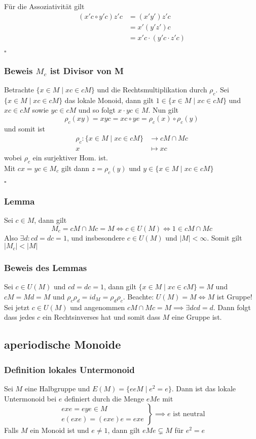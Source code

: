 \documentclass[12pt, german]{article}
\newcommand{\bewiesen}{
	
	\begin{flushright}
		$\square$  \\
\end{flushright}}
\begin{document}
	Für die Assoziativität gilt 
		\begin{align*}
			(x'c \circ y'c)z'c &= (x'y')z'c \\
				&= x'(y'z')c \\
				&= x'c \cdot (y'c \cdot z'c)
		\end{align*}
		\bewiesen

\subsubsection{Beweis $M_c$ ist Divisor von M}
	Betrachte $\{x \in M \mid xc \in cM\}$ und die Rechtsmultiplikation durch $\rho_c$. Sei $\{x \in M \mid xc \in cM\}$ das lokale Monoid, dann gilt $1 \in \{x \in M \mid xc \in cM\}$ und $xc \in cM$ sowie $yc \in cM$ und so folgt $x \cdot yc \in M$. Nun gilt $$\rho_c(xy) = xyc = xc \circ ye = \rho_c(x) \circ \rho_c(y)$$ und somit ist 
	\begin{align*}
		\rho_c : \{x \in M \mid xc \in cM\} &\to cM \cap Mc \\
		 x &\mapsto xc
	\end{align*} wobei $\rho_c$ ein surjektiver Hom. ist. \\
	Mit $cx = yc \in M_c$ gilt dann $z = \rho_c(y)$ und $y \in \{x \in M \mid xc \in cM\}$
	\bewiesen

\subsubsection{Lemma}
	Sei $c\in M$, dann gilt $$M_c = cM \cap Mc = M \iff c \in U(M) \iff 1 \in cM \cap Mc$$
	Also $\exists d : cd = dc = 1$, und insbesondere $c \in U(M)$ und $|M| < \infty$. Somit gilt $|M_c| < |M|$
	
\subsubsection{Beweis des Lemmas}
	Sei $c \in U(M)$ und $cd = dc = 1$, dann gilt $\{x \in M \mid xc \in cM\}  = M$ und $cM = Md = M$ und $\rho_c\rho_d = id_M = \rho_d\rho_c$. 
	Beachte: $U(M) = M \iff M$ ist Gruppe! 
	Sei jetzt $c \in U(M)$ und angenommen $cM \cap Mc = M \implies \exists d cd = d$. Dann folgt dass jedes $c$ ein Rechtsinverses hat und somit dass $M$ eine Gruppe ist.

\subsection{aperiodische Monoide}
\subsubsection{Definition lokales Untermonoid}
	Sei $M$ eine Halbgruppe  und $E(M) = \{eeM \mid e^2 = e\}$. Dann ist das lokale Untermonoid bei $e$ definiert durch die Menge $eMe$ mit 
 \[
	\left. 
	\begin{array}{lr}
	exe = eye \in M\\
	e(exe) = (exe)e = exe 
	\end{array}\right\} \implies e \text{ ist neutral}
\]
	Falls $M$ ein Monoid ist und $e\not = 1$, dann gilt $eMe \subsetneq M$ für $e^2 = e$
\end{document}
